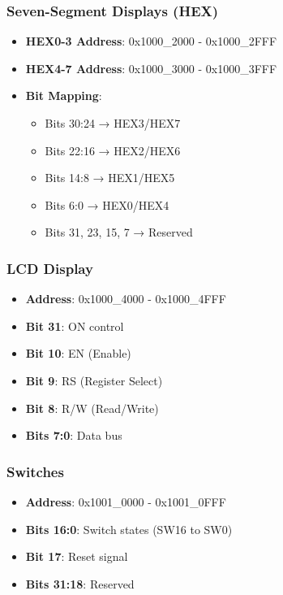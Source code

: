 \subsubsection{Seven-Segment Displays (HEX)}
\begin{itemize}
    \item \textbf{HEX0-3 Address}: 0x1000\_2000 - 0x1000\_2FFF
    \item \textbf{HEX4-7 Address}: 0x1000\_3000 - 0x1000\_3FFF
    \item \textbf{Bit Mapping}: 
    \begin{itemize}
        \item Bits 30:24 → HEX3/HEX7
        \item Bits 22:16 → HEX2/HEX6
        \item Bits 14:8 → HEX1/HEX5
        \item Bits 6:0 → HEX0/HEX4
        \item Bits 31, 23, 15, 7 → Reserved
    \end{itemize}
\end{itemize}

\subsubsection{LCD Display}
\begin{itemize}
    \item \textbf{Address}: 0x1000\_4000 - 0x1000\_4FFF
    \item \textbf{Bit 31}: ON control
    \item \textbf{Bit 10}: EN (Enable)
    \item \textbf{Bit 9}: RS (Register Select)
    \item \textbf{Bit 8}: R/W (Read/Write)
    \item \textbf{Bits 7:0}: Data bus
\end{itemize}

\subsubsection{Switches}
\begin{itemize}
    \item \textbf{Address}: 0x1001\_0000 - 0x1001\_0FFF
    \item \textbf{Bits 16:0}: Switch states (SW16 to SW0)
    \item \textbf{Bit 17}: Reset signal
    \item \textbf{Bits 31:18}: Reserved
\end{itemize}

